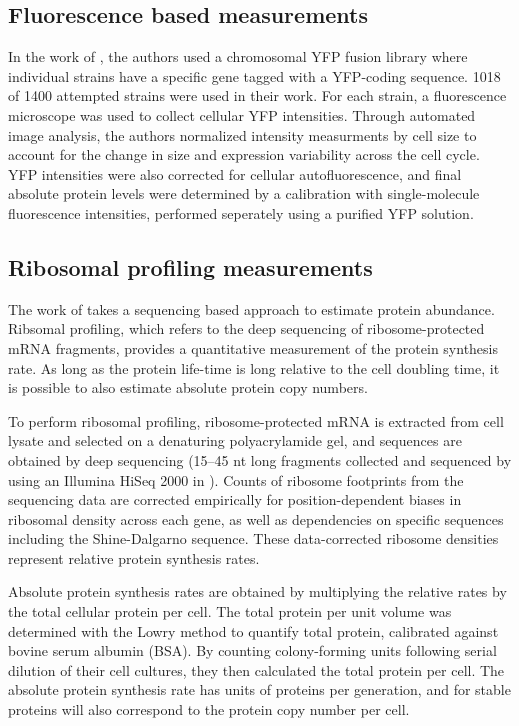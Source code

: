 \subsection{Fluorescence based measurements}
In the work of \cite{taniguchi2010}, the authors used a chromosomal YFP fusion
library where individual strains have a specific gene tagged with a YFP-coding
sequence. 1018 of 1400 attempted strains were used in their work. For each
strain, a fluorescence microscope was used to collect cellular YFP intensities.
Through automated image analysis, the authors normalized intensity measurments
by cell size to account for the change in size and expression variability across
the cell cycle. YFP intensities were also corrected for cellular
autofluorescence, and final absolute protein levels were determined by a
calibration with single-molecule fluorescence intensities, performed seperately
using a purified YFP solution.

\subsection{Ribosomal profiling measurements}
The work of \cite{li2014} takes a sequencing based approach to estimate protein
abundance. Ribsomal profiling, which refers to the deep sequencing of
ribosome-protected mRNA fragments, provides a quantitative measurement of the
protein synthesis rate.  As long as the protein life-time is long relative to
the cell doubling time, it is possible to  also estimate absolute protein copy
numbers.

To perform ribosomal profiling, ribosome-protected mRNA is extracted from cell
lysate  and selected on a denaturing polyacrylamide gel, and sequences are
obtained by deep sequencing (15–45 nt long fragments collected and sequenced  by
using an Illumina HiSeq 2000 in \cite{li2014}). Counts of ribosome footprints
from the sequencing data are corrected empirically for position-dependent biases
in ribosomal density across each gene, as well as dependencies on specific
sequences including the Shine-Dalgarno sequence. These data-corrected ribosome
densities represent relative protein synthesis rates.

Absolute protein synthesis rates are obtained by multiplying the relative rates
by the total cellular protein per cell. The total protein  per unit volume  was
determined with the Lowry method to quantify total protein, calibrated against
bovine serum albumin (BSA). By counting colony-forming units following serial
dilution of their cell cultures, they then calculated the total protein per
cell. The absolute protein synthesis rate has units of  proteins per generation,
and for stable proteins will also correspond to the protein  copy number per
cell.

